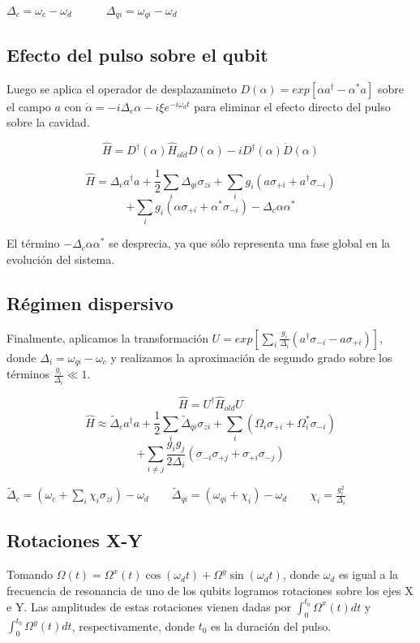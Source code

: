 $\Delta_c = \omega_c - \omega_d \qquad \quad \Delta_{qi} = \omega_{qi} - \omega_d$

\subsection{Efecto del pulso sobre el qubit}

Luego se aplica el operador de desplazamineto $D(\alpha) = exp[\alpha a^\dagger - \alpha^* a]$ sobre el campo $a$ con $\dot{\alpha} = -i \Delta_c \alpha -i \xi e^{-i \omega_d t}$ para eliminar el efecto directo del pulso sobre la cavidad.

$$\hat{H} = D^\dagger (\alpha) \hat{H}_{old} D(\alpha) -i D^\dagger(\alpha) \dot{D}(\alpha)$$

$$\hat{H} = \Delta_c a^\dagger a + \frac{1}{2} \sum\limits_i \Delta_{qi} \sigma_{zi} + \sum\limits_i g_i (a \sigma_{+i} + a^\dagger \sigma_{-i})$$
$$ + \sum\limits_i g_i (\alpha \sigma_{+i} + \alpha^* \sigma_{-i}) - \Delta_c \alpha \alpha^* $$

El término $-\Delta_c \alpha \alpha^*$ se desprecia, ya que sólo representa una fase global en la evolución del sistema.

\subsection{Régimen dispersivo}

Finalmente, aplicamos la transformación $U = exp[\sum\limits_i \frac{g_i} {\Delta_i} (a^\dagger \sigma_{-i} - a \sigma_{+i})]$, donde $\Delta_i = \omega_{qi} - \omega_c$ y realizamos la aproximación de segundo grado sobre los términos $\frac{g_i}{\Delta_i} \ll 1$.

$$\hat{H} = U^\dagger \hat{H}_{old} U$$
$$\hat{H} \approx \tilde{\Delta}_c a^\dagger a + \frac{1}{2} \sum\limits_i \tilde{\Delta}_{qi} \sigma_{zi} + \sum\limits_i (\Omega_i \sigma_{+i} + \Omega_i^* \sigma_{-i})$$
$$+ \sum\limits_{i \neq j} \frac{g_i g_j}{2 \Delta_i} (\sigma_{-i} \sigma_{+j}+\sigma_{+i} \sigma_{-j})$$

$\tilde{\Delta}_c = (\omega_c + \sum\limits_i \chi_i \sigma_{zi}) - \omega_d
 \qquad
 \tilde{\Delta}_{qi} = (\omega_{qi} + \chi_i) - \omega_d
 \qquad
 \chi_i = \frac{g_i^2}{\Delta_i}$

\subsection{Rotaciones X-Y}

Tomando $\Omega(t) = \Omega^x(t) \cos(\omega_d t) + \Omega^y \sin(\omega_d t)$, donde $\omega_d$ es igual a la frecuencia de resonancia de uno de los qubits logramos rotaciones sobre los ejes X e Y. Las amplitudes de estas rotaciones vienen dadas por $\int_0^{t_0} \Omega^x(t) dt$ y $\int_0^{t_0} \Omega^y(t) dt$, respectivamente, donde $t_0$ es la duración del pulso.

